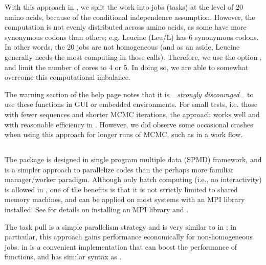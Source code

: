 With this approach in , we split the work into jobs (tasks) at the 
level of 20 amino acids, because of the conditional independence assumption. 
However, the computation is not evenly distributed across amino acids, as some
have more synonymous codons than others; e.g. Leucine (Leu/L)
has 6 synonymous codons. In other words, the 20 jobs are not homogeneous (and 
as an aside, Leucine generally needs the most computing in those 
 calls).  Therefore, we use the  option 
, and limit the number of cores to 4 or 5. In 
doing so, we are able to somewhat overcome this computational imbalance.

The warning section of the  help page notes that it is
\textit{\_strongly discouraged\_} to use these functions in GUI or embedded
environments.  For small tests, i.e. those with fewer sequences and 
shorter MCMC iterations, the  
approach works well and with reasonable efficiency in . 
However, we did observe some occasional crashes when using this approach for 
longer runs of MCMC, such as in a work flow.


\subsection[task.pull()]{}
\label{sec:task.pull}

The  package is designed in single program multiple data (SPMD) 
framework, and is a simpler approach to parallelize codes than the perhaps more 
familiar manager/worker paradigm.
Although only batch computing (i.e., no interactivity) is allowed in 
, one of the benefits is that it is not strictly limited to
shared memory machines, and can be applied on most systems with an MPI library 
installed.  See \citet{Chen2012pbdMPIvignette} for details on 
installing an MPI library and .

The task pull is a simple parallelism strategy and is very similar to 
 in ; in particular, this 
approach gains performance economically for non-homogeneous jobs.
 in  is a convenient implementation that can 
boost the performance of  functions, and has similar 
syntax as .  


